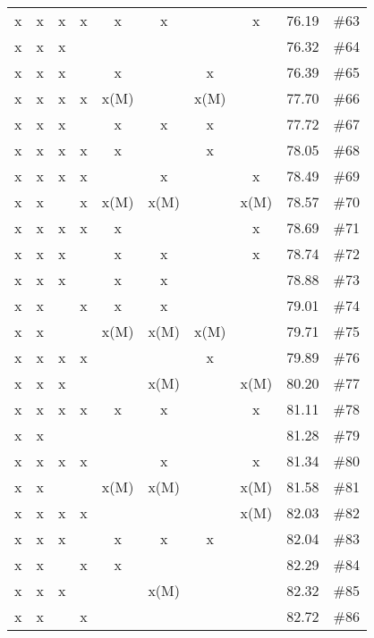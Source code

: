 \begin{longtable}{|c|c|c|c|c|c|c|c|c|c|}
 x    & x    & x    & x    & x    & x    &      & x    & 76.19 & \#63 \\
 x    & x    & x    &      &      &      &      &      & 76.32 & \#64 \\
 x    & x    & x    &      & x    &      & x    &      & 76.39 & \#65 \\
 x    & x    & x    & x    & x(M) &      & x(M) &      & 77.70 & \#66 \\
 x    & x    & x    &      & x    & x    & x    &      & 77.72 & \#67 \\
 x    & x    & x    & x    & x    &      & x    &      & 78.05 & \#68 \\
 x    & x    & x    & x    &      & x    &      & x    & 78.49 & \#69 \\
 x    & x    &      & x    & x(M) & x(M) &      & x(M) & 78.57 & \#70 \\
 x    & x    & x    & x    & x    &      &      & x    & 78.69 & \#71 \\
 x    & x    & x    &      & x    & x    &      & x    & 78.74 & \#72 \\
 x    & x    & x    &      & x    & x    &      &      & 78.88 & \#73 \\
 x    & x    &      & x    & x    & x    &      &      & 79.01 & \#74 \\
 x    & x    &      &      & x(M) & x(M) & x(M) &      & 79.71 & \#75 \\
 x    & x    & x    & x    &      &      & x    &      & 79.89 & \#76 \\
 x    & x    & x    &      &      & x(M) &      & x(M) & 80.20 & \#77 \\
 x    & x    & x    & x    & x    & x    &      & x    & 81.11 & \#78 \\
 x    & x    &      &      &      &      &      &      & 81.28 & \#79 \\
 x    & x    & x    & x    &      & x    &      & x    & 81.34 & \#80 \\
 x    & x    &      &      & x(M) & x(M) &      & x(M) & 81.58 & \#81 \\
 x    & x    & x    & x    &      &      &      & x(M) & 82.03 & \#82 \\
 x    & x    & x    &      & x    & x    & x    &      & 82.04 & \#83 \\
 x    & x    &      & x    & x    &      &      &      & 82.29 & \#84 \\
 x    & x    & x    &      &      & x(M) &      &      & 82.32 & \#85 \\
 x    & x    &      & x    &      &      &      &      & 82.72 & \#86 \\

\end{longtable}
